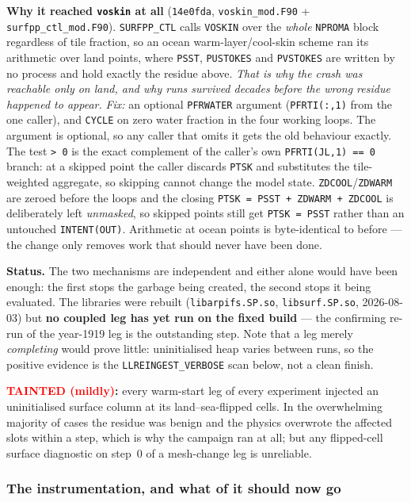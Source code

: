 \documentclass[11pt,a4paper]{article}
\newcommand{\code}[1]{\texttt{\small #1}}
\begin{document}
\textbf{Why it reached \code{voskin} at all} (\code{14e0fda}, \code{voskin\_mod.F90} +
\code{surfpp\_ctl\_mod.F90}). \code{SURFPP\_CTL} calls \code{VOSKIN} over the \emph{whole} \code{NPROMA}
block regardless of tile fraction, so an ocean warm-layer/cool-skin scheme ran its arithmetic over land
points, where \code{PSST}, \code{PUSTOKES} and \code{PVSTOKES} are written by no process and hold exactly
the residue above. \emph{That is why the crash was reachable only on land, and why runs survived decades
before the wrong residue happened to appear.} \emph{Fix:} an optional \code{PFRWATER} argument
(\code{PFRTI(:,1)} from the one caller), and \code{CYCLE} on zero water fraction in the four working
loops. The argument is optional, so any caller that omits it gets the old behaviour exactly. The test
\code{> 0} is the exact complement of the caller's own \code{PFRTI(JL,1) == 0} branch: at a skipped point
the caller discards \code{PTSK} and substitutes the tile-weighted aggregate, so skipping cannot change
the model state. \code{ZDCOOL}/\code{ZDWARM} are zeroed before the loops and the closing
\code{PTSK = PSST + ZDWARM + ZDCOOL} is deliberately left \emph{unmasked}, so skipped points still get
\code{PTSK = PSST} rather than an untouched \code{INTENT(OUT)}. Arithmetic at ocean points is
byte-identical to before --- the change only removes work that should never have been done.

\textbf{Status.} The two mechanisms are independent and either alone would have been enough: the first
stops the garbage being created, the second stops it being evaluated. The libraries were rebuilt
(\code{libarpifs.SP.so}, \code{libsurf.SP.so}, 2026-08-03) but \textbf{no coupled leg has yet run on the
fixed build} --- the confirming re-run of the year-1919 leg is the outstanding step. Note that a leg
merely \emph{completing} would prove little: uninitialised heap varies between runs, so the positive
evidence is the \code{LLREINGEST\_VERBOSE} scan below, not a clean finish.

\textbf{\textcolor{red}{TAINTED (mildly)}:} every warm-start leg of every experiment injected an
uninitialised surface column at its land--sea-flipped cells. In the overwhelming majority of cases the
residue was benign and the physics overwrote the affected slots within a step, which is why the campaign
ran at all; but any flipped-cell surface diagnostic on step~0 of a mesh-change leg is unreliable.

\subsubsection*{The instrumentation, and what of it should now go}
\end{document}
